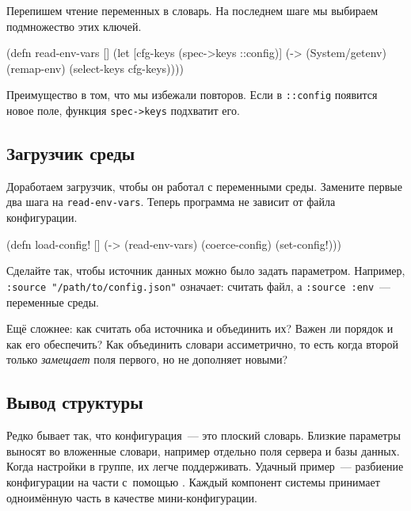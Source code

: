 \noindent
Перепишем чтение переменных в словарь. На последнем шаге мы выбираем
подмножество этих ключей.

\begin{english}
  \begin{clojure}
(defn read-env-vars []
  (let [cfg-keys (spec->keys ::config)]
    (-> (System/getenv)
        (remap-env)
        (select-keys cfg-keys))))
  \end{clojure}
\end{english}

Преимущество в том, что мы избежали повторов. Если в \verb|::config| появится
новое поле, функция \verb|spec->keys| подхватит его.

\subsection{Загрузчик среды}

Доработаем загрузчик, чтобы он работал с переменными среды. Замените первые два
шага на \verb|read-env-vars|. Теперь программа не зависит от файла
конфигурации.

\begin{english}
  \begin{clojure}
(defn load-config! []
  (-> (read-env-vars)
      (coerce-config)
      (set-config!)))
  \end{clojure}
\end{english}

Сделайте так, чтобы источник данных можно было задать параметром. Например,
\verb|:source "/path/to/config.json"| означает: считать файл, а
\verb|:source :env|~--- переменные среды.


Ещё сложнее: как считать оба источника и объединить их? Важен ли порядок и
как его обеспечить? Как объединить словари ассиметрично, то есть когда второй
только \emph{замещает} поля первого, но не дополняет новыми?

\subsection{Вывод структуры}


Редко бывает так, что конфигурация~--- это плоский словарь. Близкие параметры
выносят во вложенные словари, например отдельно поля сервера и базы
данных. Когда настройки в группе, их легче поддерживать. Удачный пример~---
разбиение конфигурации на части с~помощью .
Каждый компонент системы принимает одноимённую часть в качестве мини-конфигурации.

